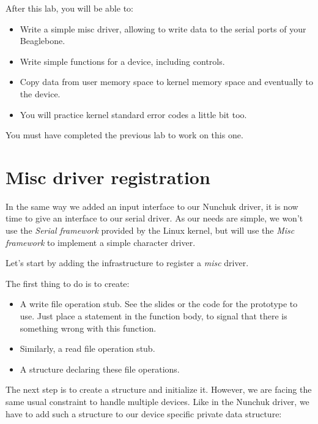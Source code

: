 
After this lab, you will be able to:

\begin{itemize}
\item Write a simple misc driver, allowing to write data to the
  serial ports of your Beaglebone.
\item Write simple  functions for a device,
  including  controls.
\item Copy data from user memory space to kernel memory space and
  eventually to the device.
\item You will practice kernel standard error codes a little bit too.
\end{itemize}

You must have completed the previous lab to work on this one.

\section{Misc driver registration}

In the same way we added an input interface to our Nunchuk driver, it is
now time to give an interface to our serial driver. As our needs are
simple, we won't use the {\em Serial framework} provided by the Linux
kernel, but will use the {\em Misc framework} to implement a simple
character driver.

Let's start by adding the infrastructure to register a {\em misc}
driver.

The first thing to do is to create:

\begin{itemize}
\item A  write file operation stub.
      See the slides or the code for the prototype to use.
      Just place a  statement in the function
      body, to signal that there is something wrong with this function.
\item Similarly, a  read file operation stub.
\item A  structure declaring these file
      operations.
\end{itemize}

The next step is to create a  structure and initialize
it. However, we are facing the same usual constraint to handle multiple
devices. Like in the Nunchuk driver, we have to add such a structure
to our device specific private data structure:

